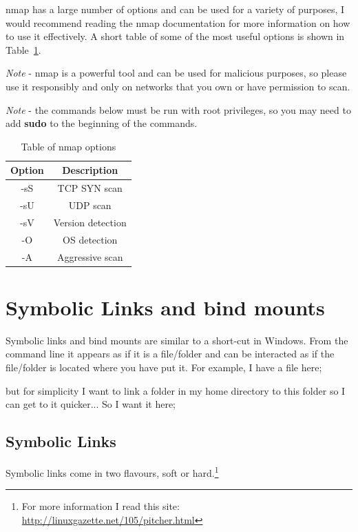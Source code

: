 nmap has a large number of options and can be used for a variety of purposes, I would recommend reading the nmap documentation for more information on how to use it effectively. A short table of some of the most useful options is shown in Table~\ref{tab:nmap}.

\textit{Note} - nmap is a powerful tool and can be used for malicious purposes, so please use it responsibly and only on networks that you own or have permission to scan.

\textit{Note} - the commands below must be run with root privileges, so you may need to add \textbf{sudo} to the beginning of the commands.

\begin{table}[!th]
\centering
\begin{tabular}{cc}
\hline
Option & Description\\
\hline
-sS & TCP SYN scan\\
-sU & UDP scan\\
-sV & Version detection\\
-O & OS detection\\
-A & Aggressive scan\\
\hline
\end{tabular}
\caption{Table of nmap options}
\label{tab:nmap}
\end{table}


\section{Symbolic Links and bind mounts}
\label{sec:symlink}

Symbolic links and bind mounts are similar to a short-cut in Windows.  From the command line it appears as if it is a file/folder and can be interacted as if the file/folder is located where you have put it.  For example, I have a file here;


but for simplicity I want to link a folder in my home directory to this folder so I can get to it quicker... So I want it here;


\subsection{Symbolic Links}

Symbolic links come in two flavours, soft or hard.\footnote{For more information I read this site: \url{http://linuxgazette.net/105/pitcher.html}}

